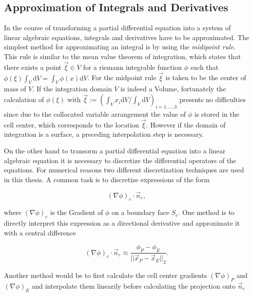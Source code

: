     \subsection{Approximation of Integrals and Derivatives}

    In the course of transforming a partial differential equation into a system of linear algebraic equations, integrals and derivatives have to be approximated. The simplest method for approximating an integral is by using the \textit{midipoint rule}. This rule is similar to the mean value theorem of integration, which states that there exists a point \(\vec{\xi} \in V\) for a riemann integrable function \(\phi\) such that \(\phi(\xi) \int_V \mathrm{d}V = \int_V \phi(x) \mathrm{d}V\). For the midpoint rule \(\vec{\xi}\) is taken to be the center of mass of \(V\). If the integration domain \(V\) is indeed a Volume, fortunately the calculation of \(\phi(\mathbb{\xi})\) with \(\vec{\xi} := \left({ \int_V x_i \mathrm{d}V }/{ \int_V \mathrm{d}V } \right)_{i = 1,\dots,3}\) presents no difficulties since due to the collocated variable arrangement the value of \(\phi\) is stored in the cell center, which corresponds to the location \(\vec{\xi}\). However if the domain of integration is a surface, a preceding interpolation step is necessary.

    On the other hand to transorm a partial differential equation into a linear algebraic equation it is necessary to discretize the differential operators of the equations. For numerical reasons two different discretization techniques are used in this thesis. A common task is to discretize expressions of the form

    \begin{displaymath}
      \left(\nabla \phi\right)_e \cdot \vec{n}_e,
    \end{displaymath}

    where \(\left(\nabla \phi\right)_e\) is the Gradient of \(\phi\) on a boundary face \(S_e\). One method is to directly interpret this expression as a directional derivative and approximate it with a central difference

    \begin{equation}
      \label{eq:cds}
      \left(\nabla \phi\right)_e \cdot \vec{n}_e \approx \frac{\phi_P - \phi_E}{|| \vec{x}_P - \vec{x}_E ||_2}.
    \end{equation}

    Another method would be to first calculate the cell center gradients \(\left(\nabla \phi \right)_P\) and \(\left(\nabla \phi \right)_E\) and interpolate them linearily before calculating the projection onto \(\vec{n}_e\)

